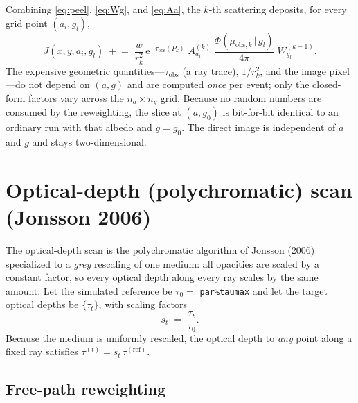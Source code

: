 \documentclass[english,a4paper]{kiseon_memo}
\newcommand{\ee}{\mathrm{e}}
\newcommand{\obs}{\mathrm{obs}}
\newcommand{\HG}{\Phi}
\begin{document}
Combining \eqref{eq:peel}, \eqref{eq:Wg}, and \eqref{eq:Aa}, the $k$-th
scattering deposits, for every grid point $(a_i,g_l)$,
\begin{equation}
  J(x,y,a_i,g_l)\;\mathrel{+}=\;
  \frac{w}{r_k^2}\,\ee^{-\tau_\obs(P_k)}\;
  A_{a_i}^{(k)}\;\frac{\HG(\mu_{\obs,k}\,|\,g_l)}{4\pi}\;W_{g_l}^{(k-1)} .
  \label{eq:J4}
\end{equation}
The expensive geometric quantities---$\tau_\obs$ (a ray trace), $1/r_k^2$, and the
image pixel---do not depend on $(a,g)$ and are computed \emph{once} per event;
only the closed-form factors vary across the $n_a\times n_g$ grid.  Because no
random numbers are consumed by the reweighting, the slice at $(a,g_0)$ is
bit-for-bit identical to an ordinary run with that albedo and $g=g_0$.  The
direct image is independent of $a$ and $g$ and stays two-dimensional.

\section{Optical-depth (polychromatic) scan (Jonsson 2006)}

The optical-depth scan is the polychromatic algorithm of Jonsson (2006)
specialized to a \emph{grey} rescaling of one medium: all opacities are scaled by
a constant factor, so every optical depth along every ray scales by the same
amount.  Let the simulated reference be $\tau_0=$ \texttt{par\%taumax} and let the
target optical depths be $\{\tau_t\}$, with scaling factors
\begin{equation}
  s_t \;=\; \frac{\tau_t}{\tau_0} .
  \label{eq:st}
\end{equation}
Because the medium is uniformly rescaled, the optical depth to \emph{any} point
along a fixed ray satisfies $\tau^{(t)}=s_t\,\tau^{(\mathrm{ref})}$.

\subsection{Free-path reweighting}
\end{document}

